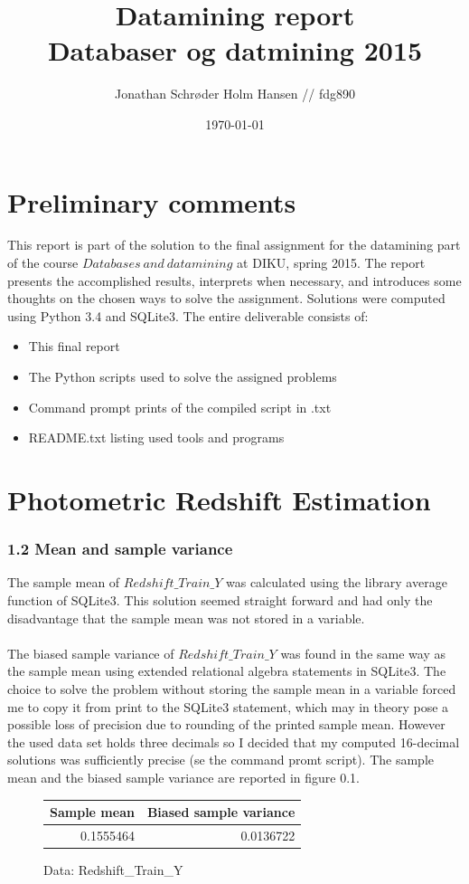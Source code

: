 \documentclass[a4paper,danish,8pt,oneside,openany]{memoir}
\title{Datamining report \\ Databaser og datmining 2015}
\author{Jonathan Schrøder Holm Hansen // fdg890}
\date{\today}
\begin{document}

\begin{titlingpage}
\maketitle
\end{titlingpage}
\section*{Preliminary comments}
This report is part of the solution to the final assignment for the datamining part of the course $Databases \ and \ datamining$ at DIKU, spring 2015.
%
The report presents the accomplished results, interprets when necessary, and introduces some thoughts on the chosen ways to solve the assignment.
Solutions were computed using Python 3.4 and SQLite3. The entire deliverable consists of:
%
\begin{itemize}
\item This final report
\item The Python scripts used to solve the assigned problems
\item Command prompt prints of the compiled script in .txt
\item README.txt listing used tools and programs
\end{itemize}
%
\vspace*{0.3cm}
%
\section*{Photometric Redshift Estimation}
\subsubsection*{1.2 Mean and sample variance}
%
The sample mean of $Redshift\_Train\_Y$ was calculated using the library average function of SQLite3. This solution seemed straight forward and had only the disadvantage that the sample mean was not stored in a variable.
\\
\\
The biased sample variance of $Redshift\_Train\_Y$ was found in the same way as the sample mean using extended relational algebra statements in SQLite3. The choice to solve the problem without storing the sample mean in a variable forced me to copy it from print to the SQLite3 statement, which may in theory pose a possible loss of precision due to rounding of the printed sample mean. However the used data set holds three decimals so I decided that my computed 16-decimal solutions was sufficiently precise (se the command promt script). The sample mean and the biased sample variance are reported in figure 0.1.
\\
\begin{figure}[!h]
\centering
\begin{tabular}{|r|r|}
\hline
\textbf{Sample mean} & \textbf{Biased sample variance}\\ \hline
0.1555464 & 0.0136722 \\ \hline
\end{tabular}
\caption{Data: Redshift\_Train\_Y}
\end{figure}
\newpage
%
\end{document}
